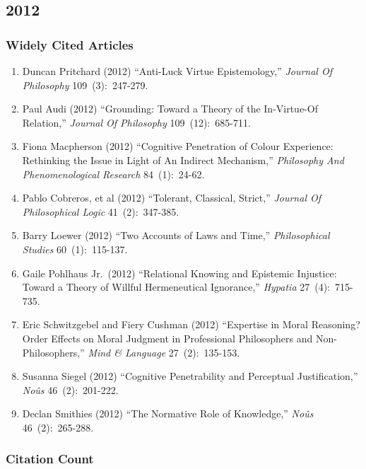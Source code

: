\documentclass[
  10pt,
  letterpaper,
  DIV=11,
  numbers=noendperiod,
  twoside]{scrartcl}
\providecommand{\tightlist}{%
  \setlength{\itemsep}{0pt}\setlength{\parskip}{0pt}}\usepackage{longtable,booktabs,array}
\begin{document}
\newpage

\subsection{2012}\label{sec-s2012}

\subsubsection*{Widely Cited Articles}\label{widely-cited-articles-56}

\begin{enumerate}
\def\labelenumi{\arabic{enumi}.}
\tightlist
\item
  Duncan Pritchard (2012) ``Anti-Luck Virtue Epistemology,''
  \emph{Journal Of Philosophy} 109~(3):~247-279.
\item
  Paul Audi (2012) ``Grounding: Toward a Theory of the In-Virtue-Of
  Relation,'' \emph{Journal Of Philosophy} 109~(12):~685-711.
\item
  Fiona Macpherson (2012) ``Cognitive Penetration of Colour Experience:
  Rethinking the Issue in Light of An Indirect Mechanism,''
  \emph{Philosophy And Phenomenological Research} 84~(1):~24-62.
\item
  Pablo Cobreros, et al (2012) ``Tolerant, Classical, Strict,''
  \emph{Journal Of Philosophical Logic} 41~(2):~347-385.
\item
  Barry Loewer (2012) ``Two Accounts of Laws and Time,''
  \emph{Philosophical Studies} 60~(1):~115-137.
\item
  Gaile Pohlhaus Jr.~(2012) ``Relational Knowing and Epistemic
  Injustice: Toward a Theory of Willful Hermeneutical Ignorance,''
  \emph{Hypatia} 27~(4):~715-735.
\item
  Eric Schwitzgebel and Fiery Cushman (2012) ``Expertise in Moral
  Reasoning? Order Effects on Moral Judgment in Professional
  Philosophers and Non-Philosophers,'' \emph{Mind \& Language}
  27~(2):~135-153.
\item
  Susanna Siegel (2012) ``Cognitive Penetrability and Perceptual
  Justification,'' \emph{Noûs} 46~(2):~201-222.
\item
  Declan Smithies (2012) ``The Normative Role of Knowledge,''
  \emph{Noûs} 46~(2):~265-288.
\end{enumerate}

\subsubsection*{Citation Count}\label{sec-count-2012}
\end{document}
